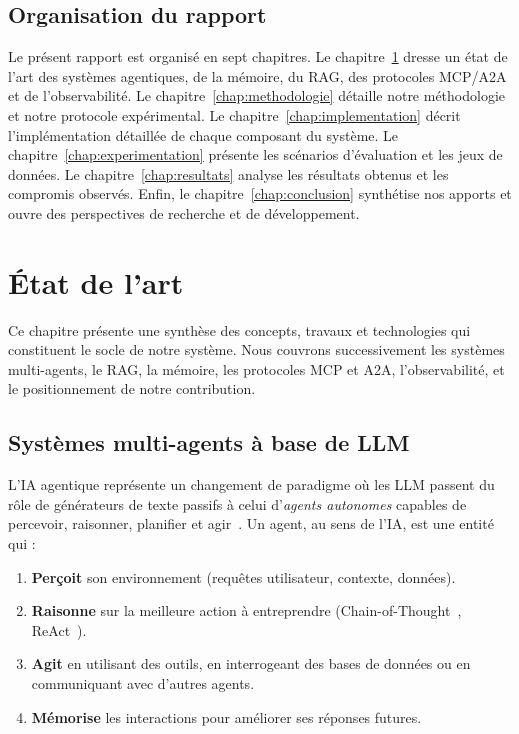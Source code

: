 \documentclass[12pt, a4paper]{article}
\newcommand{\acrshort}[1]{\MakeUppercase{#1}}
\begin{document}
\subsection{Organisation du rapport}

Le présent rapport est organisé en sept chapitres. Le chapitre~\ref{chap:etat_art} dresse un état de l'art des systèmes agentiques, de la mémoire, du RAG, des protocoles MCP/A2A et de l'observabilité. Le chapitre~\ref{chap:methodologie} détaille notre méthodologie et notre protocole expérimental. Le chapitre~\ref{chap:implementation} décrit l'implémentation détaillée de chaque composant du système. Le chapitre~\ref{chap:experimentation} présente les scénarios d'évaluation et les jeux de données. Le chapitre~\ref{chap:resultats} analyse les résultats obtenus et les compromis observés. Enfin, le chapitre~\ref{chap:conclusion} synthétise nos apports et ouvre des perspectives de recherche et de développement.


\section{État de l'art}
\label{chap:etat_art}

Ce chapitre présente une synthèse des concepts, travaux et technologies qui constituent le socle de notre système. Nous couvrons successivement les systèmes multi-agents, le RAG, la mémoire, les protocoles MCP et A2A, l'observabilité, et le positionnement de notre contribution.

\subsection{Systèmes multi-agents à base de LLM}

L'IA agentique représente un changement de paradigme où les \acrshort{llm} passent du rôle de générateurs de texte passifs à celui d'\emph{agents autonomes} capables de percevoir, raisonner, planifier et agir~\cite{xi2023rise, wang2024survey}. Un agent, au sens de l'IA, est une entité qui :

\begin{enumerate}
  \item \textbf{Perçoit} son environnement (requêtes utilisateur, contexte, données).
  \item \textbf{Raisonne} sur la meilleure action à entreprendre (Chain-of-Thought~\cite{wei2022cot}, ReAct~\cite{yao2023react}).
  \item \textbf{Agit} en utilisant des outils, en interrogeant des bases de données ou en communiquant avec d'autres agents.
  \item \textbf{Mémorise} les interactions pour améliorer ses réponses futures.
\end{enumerate}
\end{document}
